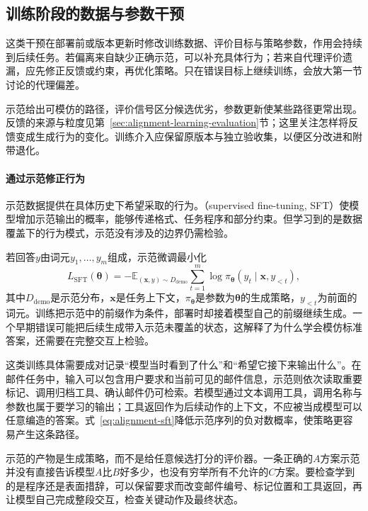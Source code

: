 \subsection{训练阶段的数据与参数干预}
\label{sec:alignment-learning}
\label{sec:alignment-learning-demonstration}
\label{sec:alignment-learning-policy}

这类干预在部署前或版本更新时修改训练数据、评价目标与策略参数，作用会持续到后续任务。若偏离来自缺少正确示范，可以补充具体行为；若来自代理评价遗漏，应先修正反馈或约束，再优化策略。只在错误目标上继续训练，会放大第一节讨论的代理偏差。

示范给出可模仿的路径，评价信号区分候选优劣，参数更新使某些路径更常出现。反馈的来源与粒度见第~\ref{sec:alignment-learning-evaluation}节；这里关注怎样将反馈变成生成行为的变化。训练介入应保留原版本与独立验收集，以便区分改进和附带退化。

\paragraph{通过示范修正行为}

示范数据提供在具体历史下希望采取的行为。（supervised fine-tuning, SFT）使模型增加示范输出的概率，能够传递格式、任务程序和部分约束。但学习到的是数据覆盖下的行为模式，示范没有涉及的边界仍需检验。

若回答$y$由词元$y_1,\ldots,y_m$组成，示范微调最小化
\begin{equation}
 L_{\mathrm{SFT}}(\bm{\theta})
 =-\mathbb E_{(\bm{x},y)\sim D_{\mathrm{demo}}}
   \sum_{t=1}^{m}\log\pi_{\bm{\theta}}
          (y_t\mid\bm{x},y_{<t}),
 \label{eq:alignment-sft}
\end{equation}
其中$D_{\mathrm{demo}}$是示范分布，$\bm{x}$是任务上下文，$\pi_{\bm{\theta}}$是参数为$\bm{\theta}$的生成策略，$y_{<t}$为前面的词元。训练把示范中的前缀作为条件，部署时却接着模型自己的前缀继续生成。一个早期错误可能把后续生成带入示范未覆盖的状态，这解释了为什么学会模仿标准答案，还需要在完整交互上检验。

这类训练具体需要成对记录“模型当时看到了什么”和“希望它接下来输出什么”。在邮件任务中，输入可以包含用户要求和当前可见的邮件信息，示范则依次读取重要标记、调用归档工具、确认邮件仍可检索。若模型通过文本调用工具，调用名称与参数也属于要学习的输出；工具返回作为后续动作的上下文，不应被当成模型可以任意编造的答案。式~\eqref{eq:alignment-sft}降低示范序列的负对数概率，使策略更容易产生这条路径。

示范的产物是生成策略，而不是给任意候选打分的评价器。一条正确的$A$方案示范并没有直接告诉模型$A$比$B$好多少，也没有穷举所有不允许的$C$方案。要检查学到的是程序还是表面措辞，可以保留要求而改变邮件编号、标记位置和工具返回，再让模型自己完成整段交互，检查关键动作及最终状态。

